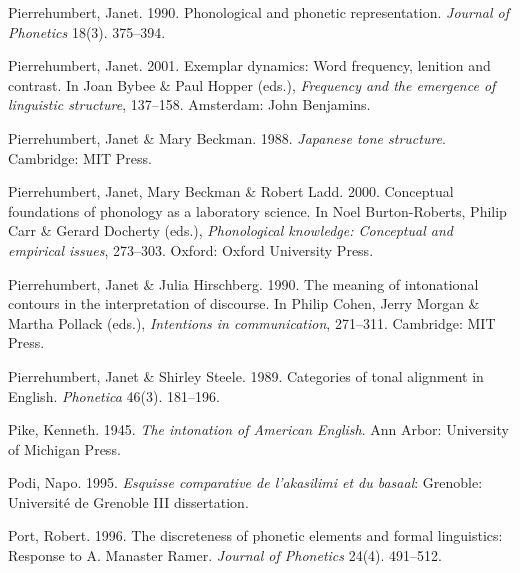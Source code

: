 \documentclass[ number=1
,series=labphon
,output=long
,url=http://langsci-press.org/catalog/book/16
,isbn=978-3-944675-01-5
]{LSP/langsci}
\begin{document}
\begin{thebibliography}{284}
Pierrehumbert, Janet. 1990.
\newblock Phonological and phonetic representation.
\newblock \emph{Journal of Phonetics} 18(3). 375--394.

Pierrehumbert, Janet. 2001.
\newblock Exemplar dynamics: {W}ord frequency, lenition and contrast.
\newblock In Joan Bybee \& Paul Hopper (eds.), \emph{Frequency and the
  emergence of linguistic structure}, 137--158. Amsterdam: John Benjamins.

Pierrehumbert, Janet \& Mary Beckman. 1988.
\newblock \emph{Japanese tone structure}.
\newblock Cambridge: MIT Press.

Pierrehumbert, Janet, Mary Beckman \& Robert Ladd. 2000.
\newblock Conceptual foundations of phonology as a laboratory science.
\newblock In Noel Burton-Roberts, Philip Carr \& Gerard Docherty (eds.),
  \emph{Phonological knowledge: {C}onceptual and empirical issues}, 273--303.
  Oxford: Oxford University Press.

Pierrehumbert, Janet \& Julia Hirschberg. 1990.
\newblock The meaning of intonational contours in the interpretation of
  discourse.
\newblock In Philip Cohen, Jerry Morgan \& Martha Pollack (eds.),
  \emph{Intentions in communication}, 271--311. Cambridge: MIT Press.

Pierrehumbert, Janet \& Shirley Steele. 1989.
\newblock Categories of tonal alignment in {E}nglish.
\newblock \emph{Phonetica} 46(3). 181--196.

Pike, Kenneth. 1945.
\newblock \emph{The intonation of {A}merican {E}nglish}.
\newblock Ann Arbor: University of Michigan Press.

Podi, Napo. 1995.
\newblock \emph{Esquisse comparative de l'akasilimi et du basaal}: Grenoble:
  Universit\'{e} de Grenoble III dissertation.

Port, Robert. 1996.
\newblock The discreteness of phonetic elements and formal linguistics:
  {R}esponse to {A}. {M}anaster {R}amer.
\newblock \emph{Journal of Phonetics} 24(4). 491--512.


\end{thebibliography}
\end{document}
